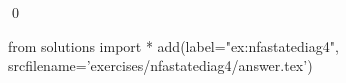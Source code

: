 
\begin{ex} 
  \label{ex:nfastatediag4}
  
  \qed
\end{ex} 
\begin{python0}
from solutions import *
add(label="ex:nfastatediag4",
    srcfilename='exercises/nfastatediag4/answer.tex') 
\end{python0}
